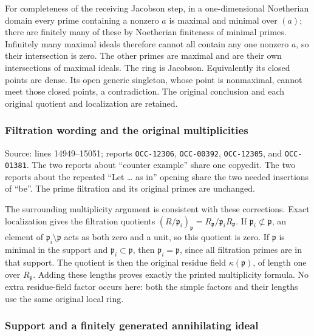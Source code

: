 For completeness of the receiving Jacobson step, in a one-dimensional Noetherian domain every prime containing a nonzero \(a\) is maximal and minimal over \((a)\); there are finitely many of these by Noetherian finiteness of minimal primes. Infinitely many maximal ideals therefore cannot all contain any one nonzero \(a\), so their intersection is zero. The other primes are maximal and are their own intersections of maximal ideals. The ring is Jacobson. Equivalently its closed points are dense. Its open generic singleton, whose point is nonmaximal, cannot meet those closed points, a contradiction. The original conclusion and each original quotient and localization are retained.

\subsubsection{Filtration wording and the original multiplicities}\label{algebra-proof-004-filtration-wording-and-the-original-multiplicities}

Source: lines 14949--15051; reports \texttt{OCC-12306}, \texttt{OCC-00392}, \texttt{OCC-12305}, and \texttt{OCC-01381}. The two reports about ``counter example'' share one copyedit. The two reports about the repeated ``Let \ldots{} as in'' opening share the two needed insertions of ``be''. The prime filtration and its original primes are unchanged.

The surrounding multiplicity argument is consistent with these corrections. Exact localization gives the filtration quotients \((R/\mathfrak p_i)_{\mathfrak p}=R_{\mathfrak p}/\mathfrak p_iR_{\mathfrak p}\). If \(\mathfrak p_i\not\subset\mathfrak p\), an element of \(\mathfrak p_i\setminus\mathfrak p\) acts as both zero and a unit, so this quotient is zero. If \(\mathfrak p\) is minimal in the support and \(\mathfrak p_i\subset\mathfrak p\), then \(\mathfrak p_i=\mathfrak p\), since all filtration primes are in that support. The quotient is then the original residue field \(\kappa(\mathfrak p)\), of length one over \(R_{\mathfrak p}\). Adding these lengths proves exactly the printed multiplicity formula. No extra residue-field factor occurs here: both the simple factors and their lengths use the same original local ring.

\subsubsection{Support and a finitely generated annihilating ideal}\label{algebra-proof-004-support-and-a-finitely-generated-annihilating-ideal}

